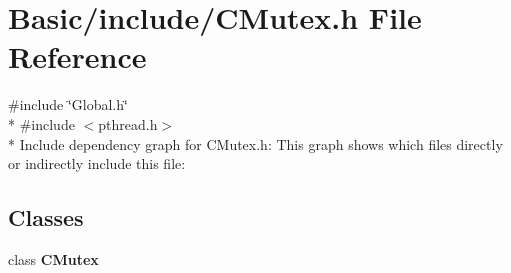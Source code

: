 \section{Basic/include/\-C\-Mutex.h File Reference}
\label{CMutex_8h}
{\ttfamily \#include \char`\"{}Global.\-h\char`\"{}}\\*
{\ttfamily \#include $<$pthread.\-h$>$}\\*
Include dependency graph for C\-Mutex.\-h\-:
This graph shows which files directly or indirectly include this file\-:
\subsection*{Classes}
\begin{DoxyCompactItemize}
\item 
class {\bf C\-Mutex}
\end{DoxyCompactItemize}
